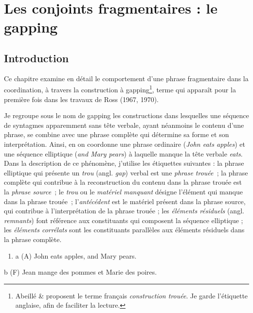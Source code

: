 
\section{Les conjoints fragmentaires : le gapping}
\subsection{Introduction}
Ce chapitre examine en détail le comportement d'une phrase fragmentaire dans la coordination, à travers la construction à gapping\footnote{Abeillé \& \citet{Mouret2010} proposent le terme français \textit{construction trouée}. Je garde l'étiquette anglaise, afin de faciliter la lecture.}, terme qui apparaît pour la première fois dans les travaux de Ross (1967, 1970).

Je regroupe sous le nom de gapping les constructions dans lesquelles une séquence de syntagmes apparemment sans tête verbale, ayant néanmoins le contenu d'une phrase, se combine avec une phrase complète qui détermine sa forme et son interprétation. Ainsi, en  on coordonne une phrase ordinaire (\textit{John eats apples}) et une séquence elliptique (\textit{and Mary pears}) à laquelle manque la tête verbale \textit{eats}. Dans la description de ce phénomène, j'utilise les étiquettes suivantes : la phrase elliptique qui présente un \textit{trou} (angl. \textit{gap}) verbal est une \textit{phrase trouée~}; la phrase complète qui contribue à la reconstruction du contenu dans la phrase trouée est la \textit{phrase source~}; le \textit{trou} ou le \textit{matériel manquant} désigne l'élément qui manque dans la phrase trouée\textit{~}; l'\textit{antécédent} est le matériel présent dans la phrase source, qui contribue à l'interprétation de la phrase trouée ; les \textit{éléments résiduels} (angl. \textit{remnants}) font référence aux constituants qui composent la séquence elliptique ; les \textit{éléments corrélats} sont les constituants parallèles aux éléments résiduels dans la phrase complète. 


\begin{enumerate}
\item \label{bkm:Ref287281281}a   (A) John eats apples, and Mary pears.  


\end{enumerate}
  b  (F) Jean mange des pommes et Marie des poires.  


